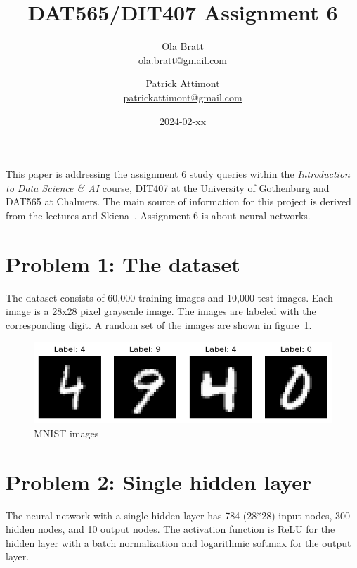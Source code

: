 \documentclass[a4paper]{article}
\begin{document}
\author{Ola Bratt \\
  \href{mailto:ola.bratt@gmail.com}{ola.bratt@gmail.com}
  \and
  Patrick Attimont \\
  \href{patrickattimont@gmail.com}{patrickattimont@gmail.com}
}

\title{DAT565/DIT407 Assignment 6}
\date{2024-02-xx}

\maketitle

This paper is addressing the assignment 6 study queries within the \emph{Introduction to Data Science \& AI} course, DIT407 at 
the University of Gothenburg and DAT565 at Chalmers. The main source of information for this project
is derived from the lectures and Skiena~\cite{Skiena:2024}. Assignment 6 is about neural networks.

\section*{Problem 1: The dataset}

The dataset consists of 60,000 training images and 10,000 test images. 
Each image is a 28x28 pixel grayscale image. 
The images are labeled with the corresponding digit. 
A random set of the images are shown in figure~\ref{fig:mnist_images}.



\begin{figure}[H]
  \begin{center}
    \includegraphics[width=\textwidth]{ola/mnist_images.png}
    \caption{MNIST images}
    \label{fig:mnist_images}
  \end{center}
\end{figure}

\section*{Problem 2: Single hidden layer}

The neural network with a single hidden layer has 784 (28*28) input nodes, 300 hidden nodes, and 10 output nodes.
The activation function is ReLU for the hidden layer with a batch normalization and logarithmic softmax for the output layer.
\end{document}
